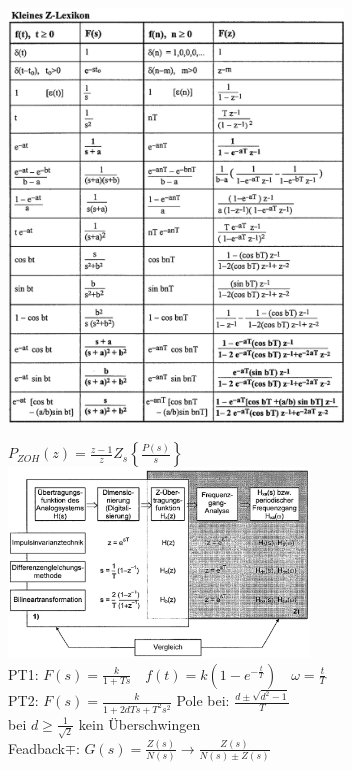 \begin{minipage}{11cm}
	\includegraphics[height=11cm]{bilder/Z-Lexikon.png}
\end{minipage}
\begin{minipage}{8cm}
	$P_{ZOH}(z)=\frac{z-1}{z} Z_s \left\lbrace  \frac{P(s)}{s} \right\rbrace $\\
	\includegraphics[width=8cm]{bilder/IIR-ArbeitsschritteundVarianten.png}\\
	PT1: $ F(s)=\frac{k}{1+Ts} \quad f(t) = k(1-e^{-\frac{t}{T}}) \quad \omega = \frac{t}{T}$\\
	PT2: $ F(s)=\frac{k}{1+2dTs + T^2s^2}$ \quad Pole bei: $\frac{d \pm \sqrt{d^2-1}}{T}$ \\
	\vspace*{0.5cm} bei $d \geq \frac{1}{\sqrt{2}}$ kein Überschwingen\\
	Feadback$\mp$: $G(s)=\frac{Z(s)}{N(s)} \rightarrow  \frac{Z(s)}{N(s) \pm Z(s)}$
\end{minipage}
